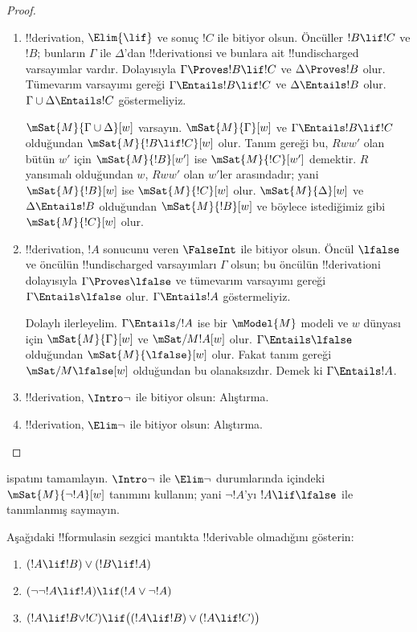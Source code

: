\documentclass[../../../include/open-logic-section]{subfiles}
\begin{document}
\begin{proof}
\begin{enumerate}
  \item !!{derivation}, $\Elim{\lif}$ ve sonuç $!C$ ile bitiyor olsun.
    Öncüller $!B\lif !C$ ve $!B$; bunların $\Gamma$ ile $\Delta$'dan
    !!{derivation}s{}i ve bunlara ait !!{undischarged} varsayımlar vardır.
    Dolayısıyla
    $\Gamma\Proves !B\lif !C$ ve $\Delta\Proves !B$ olur. Tümevarım
    varsayımı gereği $\Gamma\Entails !B\lif !C$ ve
    $\Delta\Entails !B$ olur. $\Gamma\cup\Delta\Entails !C$
    göstermeliyiz.

    $\mSat{M}{\Gamma\cup\Delta}[w]$ varsayın.
    $\mSat{M}{\Gamma}[w]$ ve $\Gamma\Entails !B\lif !C$ olduğundan
    $\mSat{M}{!B\lif !C}[w]$ olur. Tanım gereği bu, $Rww'$ olan bütün
    $w'$ için $\mSat{M}{!B}[w']$ ise $\mSat{M}{!C}[w']$ demektir.
    $R$ yansımalı olduğundan $w$, $Rww'$ olan $w'$ler arasındadır; yani
    $\mSat{M}{!B}[w]$ ise $\mSat{M}{!C}[w]$ olur.
    $\mSat{M}{\Delta}[w]$ ve $\Delta\Entails !B$ olduğundan
    $\mSat{M}{!B}[w]$ ve böylece istediğimiz gibi $\mSat{M}{!C}[w]$ olur.

  \item !!{derivation}, $!A$ sonucunu veren $\FalseInt$ ile bitiyor olsun.
    Öncül $\lfalse$ ve öncülün !!{undischarged} varsayımları $\Gamma$ olsun;
    bu öncülün !!{derivation}{}i dolayısıyla $\Gamma\Proves\lfalse$ ve
    tümevarım varsayımı
    gereği $\Gamma\Entails\lfalse$ olur. $\Gamma\Entails !A$
    göstermeliyiz.

    Dolaylı ilerleyelim. $\Gamma\Entails/ !A$ ise bir $\mModel{M}$ modeli
    ve $w$ dünyası için $\mSat{M}{\Gamma}[w]$ ve $\mSat/{M}{!A}[w]$ olur.
    $\Gamma\Entails\lfalse$ olduğundan $\mSat{M}{\lfalse}[w]$ olur. Fakat
    tanım gereği $\mSat/{M}{\lfalse}[w]$ olduğundan bu olanaksızdır.
    Demek ki $\Gamma\Entails !A$.
  \item !!{derivation}, $\Intro\lnot$ ile bitiyor olsun: Alıştırma.
  \item !!{derivation}, $\Elim\lnot$ ile bitiyor olsun: Alıştırma.
  \end{enumerate}
\end{proof}

\begin{prob}
   ispatını tamamlayın.
  $\Intro\lnot$ ile $\Elim\lnot$ durumlarında
   içindeki
  $\mSat{M}{\lnot !A}[w]$ tanımını kullanın; yani $\lnot !A$'yı
  $!A\lif\lfalse$ ile tanımlanmış saymayın.
\end{prob}

\begin{prob}
  Aşağıdaki !!{formula}s{}in sezgici mantıkta !!{derivable} olmadığını gösterin:
  \begin{enumerate}
    \item $(!A \lif !B) \lor (!B \lif !A)$
    \item $(\lnot\lnot !A \lif !A) \lif (!A \lor \lnot !A)$
    \item $(!A \lif !B \lor !C) \lif \bigl((!A \lif !B)\lor(!A \lif !C)\bigr)$
  \end{enumerate}
\end{prob}
\end{document}
